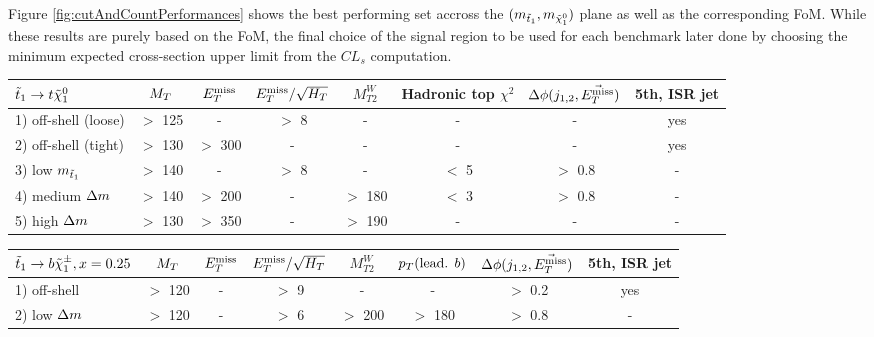     Figure \ref{fig:cutAndCountPerformances} shows the best performing set accross the
    $(m_{\tilde{t}_1},m_{\tilde{\chi}_1^0})$ plane as well as the corresponding FoM. While
    these results are purely based on the FoM, the final choice of the signal region to
    be used for each benchmark later done by choosing the minimum expected cross-section
    upper limit from the $CL_s$ computation.

\begin{table}[!ht]
{\footnotesize
\begin{center}
\hspace*{-0.8cm}
    \begin{tabular}{|l|ccccccc|}
    \hline
    $\tilde{t}_1 \rightarrow t\tilde{\chi}_1^0$ & $M_T$   & $E_T^\text{miss}$    & $E_T^\text{miss}/\sqrt{H_T}$  & $M_{T2}^W$ & Hadronic top $\chi^2$ & $\Delta\phi(j_{1,2},\vec{E_T^\text{miss}})$      &   5th, ISR jet \\
    \hline
    1) off-shell (loose)       & $>$ 125 & -       &   $>$ 8            &     -     & -             &          - &    yes        \\
    2) off-shell (tight)       & $>$ 130 & $>$ 300 &   -                &     -     & -        	    &          - &    yes        \\
    3) low    $m_{\tilde{t}_1}$  & $>$ 140 & -       &   $>$ 8            &     -     &  $<$ 5        &  $>$ 0.8   &    -          \\
    4) medium $\Delta m$        & $>$ 140 & $>$ 200 &   -                &  $>$ 180  &  $<$ 3        &  $>$ 0.8   &    -          \\
    5) high   $\Delta m$        & $>$ 130 & $>$ 350 &   -                &  $>$ 190  & -             &          - &    -          \\
        \hline
    \end{tabular}
    \hspace*{-0.5cm}
    \begin{tabular}{|l|ccccccc|}
    \hline
    $\tilde{t}_1 \rightarrow b\tilde{\chi}_1^\pm, x=0.25$   & $M_T$     & $E_T^\text{miss}$    & $E_T^\text{miss}/\sqrt{H_T}$ & $M_{T2}^W$ & $p_T(\text{lead. }b)$ & $\Delta\phi(j_{1,2},\vec{E_T^\text{miss}})$ & 5th, ISR jet  \\
    \hline
    1) off-shell        & $>$ 120   &  -       &    $>$  9       &     -      &   -                   &  $>$ 0.2      & yes           \\
    2) low    $\Delta m$ & $>$ 120   &  -       &    $>$  6       &  $>$ 200   & $>$ 180               &  $>$ 0.8      & -             \\

\end{tabular}
\end{center}}
\end{table}

